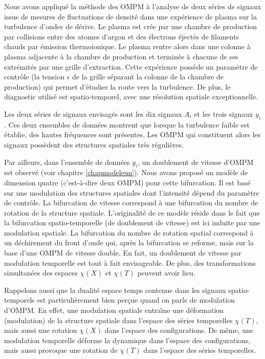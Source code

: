 \documentclass{book}
\begin{document}
Nous avons appliqu\'e la m\'ethode des OMPM \`a l'analyse de deux
s\'eries de signaux issus de mesures de fluctuations de densit\'e dans
une exp\'erience de plasma sur la turbulence d'ondes de d\'erive. Le
plasma est cr\'ee par une chambre de production par collisions entre
des atomes d'argon et des \'electrons \'eject\'es de filaments chauds
par \'emission 
thermoionique. Le plasma rentre alors dans une colonne \`a plasma 
adjacente \`a la chambre de production et
termin\'ee \`a chacune de ses extr\'emit\'es par une grille
d'extraction. Cette
exp\'erience poss\`ede un param\`etre de contr\^ole (la 
tension $\epsilon$ de la grille s\'eparant la colonne de la chambre de
production) qui permet 
d'\'etudier la route vers la turbulence. De plus, le diagnostic
utilis\'e est
spatio-temporel, avec une r\'esolution spatiale exceptionnelle. 

Les deux s\'eries de signaux envisag\'es sont  les dix signaux $A_i$
et les trois signaux $y_i$.  
Ces deux ensembles de donn\'ees montrent que lorsque la turbulence
faible est 
\'etablie, des hautes fr\'equences sont pr\'esentes. Les OMPM qui
constituent alors les signaux poss\`edent des structures spatiales
tr\`es r\'eguli\`eres.

Par ailleurs, dans l'ensemble de donn\'ees $y_i$, un doublement de
vitesse d'OMPM est observ\'e (voir chapitre \ref{chapmodeleun}). Nous
avons 
propos\'e un mod\`ele de dimension quatre (c'est-\`a-dire deux OMPM)
pour cette  
bifurcation. Il est bas\'e sur une modulation des structures spatiales
dont l'intensit\'e d\'epend du param\`etre de contr\^ole. La
bifurcation de vitesse correspond \`a une bifurcation du nombre de
rotation de la structure spatiale. L'originalit\'e de ce mod\`ele
r\'eside dans le fait que la bifurcation spatio-temporelle (de
doublement de vitesse) est ici induite par une modulation spatiale. La
bifurcation du nombre de rotation spatial correspond \`a un
d\'echirement du front d'onde qui, apr\`es la bifurcation se reforme,
mais sur la base d'une OMPM de vitesse double. En fait, un doublement
de vitesse par modulation temporelle est tout \`a fait envisageable.
De plus, des transformations simultan\'ees des espaces $\chi(X)$ et
$\chi(T)$ peuvent avoir lieu.

Rappelons aussi que la dualit\'e espace temps contenue dans les signaux
spatio-temporels est particuli\`erement bien per\c cue quand on parle de
modulation d'OMPM. En 
effet, une modulation spatiale entra\^\i ne une d\'eformation (modulation)
de la structure spatiale dans l'espace des s\'eries temporelles
$\chi(T)$, mais aussi une rotation $\chi(X)$ dans l'espace des
configurations. De m\^eme, une modulation temporelle d\'eforme la
dynamique dans l'espace des configurations, mais aussi provoque une
rotation de $\chi(T)$ dans l'espace des s\'eries temporelles.
\end{document}
